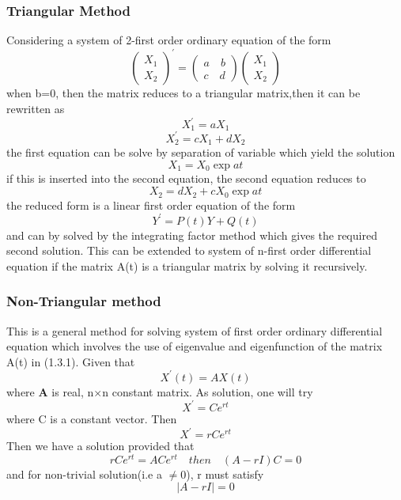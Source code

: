 \documentclass[a4paper,12pt]{report}
\numberwithin{equation}{section}
\begin{document}
\subsubsection*{\textbf{Triangular Method} }
Considering a system of 2-first order ordinary equation of the form 
\[ \begin{pmatrix}
X_{1} \\
X_{2}
\end{pmatrix}^\prime = \left( \begin{matrix}
a \quad b \\
c \quad d
\end{matrix} \right) \begin{pmatrix}
X_1 \\
X_2
\end{pmatrix} \]
when b=0, then the matrix reduces to a triangular matrix,then it can be rewritten as 
\begin{equation*}
X_{1}^\prime=aX_{1} 
\end{equation*}
\begin{equation*}
X_{2}^\prime=cX_{1}+dX_{2}
\end{equation*}
the first equation can be solve by separation of variable which yield the solution
\begin{equation*}
X_{1} = X_{0} \exp at
\end{equation*}
if this is inserted into the second equation, the second equation reduces to 
\begin{equation*}
X_{2}= dX_{2}+cX_{0}\exp at
\end{equation*}
the reduced form is a linear first order equation of the form
\begin{equation*}
Y^\prime=P(t)Y+Q(t)
\end{equation*}
and can by solved by the integrating factor method which gives the required second solution. This can be extended to system of n-first order differential equation if the matrix A(t) is a triangular matrix by solving it recursively. \\
\subsubsection*{\textbf{Non-Triangular method} }
This is a general method for solving system of first order ordinary differential equation which involves the use of eigenvalue and eigenfunction of the matrix A(t) in (1.3.1). Given that  
\begin{equation*}
X^\prime(t)=AX(t)
\end{equation*}
where \textbf{A} is real, n$\times$n constant matrix. As solution, one will try 
\begin{equation}
X^\prime=C e^{rt}
\end{equation}
where C is a constant vector. Then 
\begin{equation}
X^\prime=rCe^{rt}
\end{equation}
Then we have a solution provided that
\begin{equation*}
rCe^{rt}=ACe^{rt} \quad then \quad (A-rI)C=0
\end{equation*}
and for non-trivial solution(i.e a $\neq $0), r must satisfy
\begin{equation}
|A-rI|=0
\end{equation}
\end{document}
